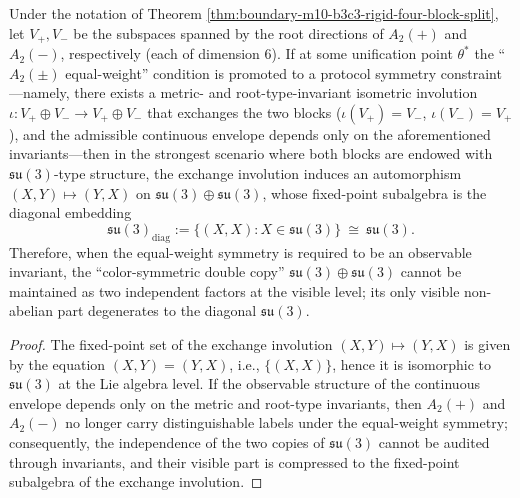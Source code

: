 \begin{proposition}\label{prop:a2pm-isotropy-diagonal-su3}
Under the notation of Theorem \ref{thm:boundary-m10-b3c3-rigid-four-block-split}, let
\(
V_{+},V_{-}
\)
be the subspaces spanned by the root directions of \(A_2(+)\) and \(A_2(-)\), respectively (each of dimension \(6\)).
If at some unification point \(\theta^\ast\) the ``\texorpdfstring{$A_2(\pm)$}{A2(±)} equal-weight'' condition is promoted to a protocol symmetry constraint---namely, there exists a metric- and root-type-invariant isometric involution
\(
\iota:V_{+}\oplus V_{-}\to V_{+}\oplus V_{-}
\)
that exchanges the two blocks (\(\iota(V_{+})=V_{-}\), \(\iota(V_{-})=V_{+}\)), and the admissible continuous envelope depends only on the aforementioned invariants---then
in the strongest scenario where both blocks are endowed with \(\mathfrak{su}(3)\)-type structure,
the exchange involution induces an automorphism \((X,Y)\mapsto (Y,X)\) on
\(
\mathfrak{su}(3)\oplus\mathfrak{su}(3)
\),
whose fixed-point subalgebra is the diagonal embedding
\[
\mathfrak{su}(3)_{\mathrm{diag}}
:=\{(X,X):X\in\mathfrak{su}(3)\}\ \cong\ \mathfrak{su}(3).
\]
Therefore, when the equal-weight symmetry is required to be an observable invariant, the ``color-symmetric double copy'' \(\mathfrak{su}(3)\oplus\mathfrak{su}(3)\) cannot be maintained as two independent factors at the visible level; its only visible non-abelian part degenerates to the diagonal \(\mathfrak{su}(3)\).
\end{proposition}
\begin{proof}
The fixed-point set of the exchange involution \((X,Y)\mapsto(Y,X)\) is given by the equation \((X,Y)=(Y,X)\), i.e., \(\{(X,X)\}\), hence it is isomorphic to \(\mathfrak{su}(3)\) at the Lie algebra level.
If the observable structure of the continuous envelope depends only on the metric and root-type invariants, then \(A_2(+)\) and \(A_2(-)\) no longer carry distinguishable labels under the equal-weight symmetry; consequently, the independence of the two copies of \(\mathfrak{su}(3)\) cannot be audited through invariants, and their visible part is compressed to the fixed-point subalgebra of the exchange involution.
\end{proof}

